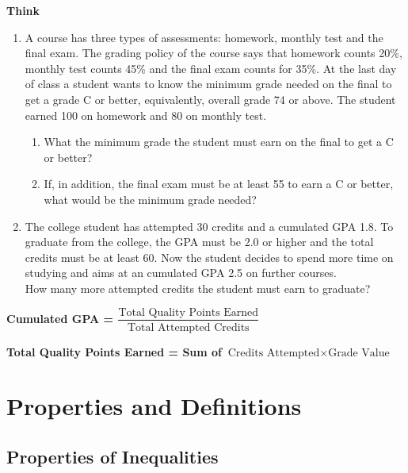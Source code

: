 \documentclass[en,12pt]{elegantbook}
\providecommand{\tightlist}{%
  \setlength{\itemsep}{0pt}\setlength{\parskip}{0pt}}
\newenvironment{rmdthink}{
	\par\noindent
	{
		\makebox[-\width][r]{
			\footnotesize
			\color{green!90}\faLightbulbO
			\hspace*{3pt}
		}
			\textbf{
				\color{second}
				Think 
			}
    }
    \begin{shaded}
    \sffamily
}{
    \par\medskip\ignorespacesafterend
    \end{shaded}
}
\providecommand{\tightlist}{%
  \setlength{\itemsep}{0pt}\setlength{\parskip}{0pt}}
\begin{document}
\begin{rmdthink}

\begin{enumerate}
\def\labelenumi{\arabic{enumi}.}
\item
  A course has three types of assessments: homework, monthly test and the final exam. The grading policy of the course says that homework counts 20\%, monthly test counts 45\% and the final exam counts for 35\%. At the last day of class a student wants to know the minimum grade needed on the final to get a grade C or better, equivalently, overall grade 74 or above. The student earned 100 on homework and 80 on monthly test.

  \begin{enumerate}
  \def\labelenumii{\arabic{enumii}.}
  \tightlist
  \item
    What the minimum grade the student must earn on the final to get a C or better?
  \item
    If, in addition, the final exam must be at least 55 to earn a C or better, what would be the minimum grade needed?
  \end{enumerate}
\item
  The college student has attempted 30 credits and a cumulated GPA 1.8. To graduate from the college, the GPA must be 2.0 or higher and the total credits must be at least 60. Now the student decides to spend more time on studying and aims at an cumulated GPA 2.5 on further courses.\\
  How many more attempted credits the student must earn to graduate?
\end{enumerate}

\textbf{Cumulated GPA = \(\dfrac{\text{Total Quality Points Earned}}{\text{Total Attempted Credits}}\)}

\textbf{Total Quality Points Earned = Sum of \(\text{Credits Attempted}\times \text{Grade Value}\)}

\end{rmdthink}

\hypertarget{properties-and-definitions}{%
\section{Properties and Definitions}\label{properties-and-definitions}}

\hypertarget{properties-of-inequalities}{%
\subsection*{Properties of Inequalities}\label{properties-of-inequalities}}
\end{document}
